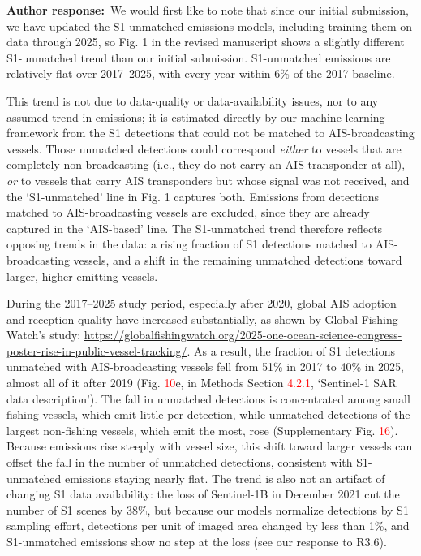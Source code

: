 \documentclass[11pt]{article}
\newcommand{\response}{\par\medskip\noindent%
  \textbf{\textcolor{respblue}{Author response:}}\ }
\begin{document}
\response We would first like to note that since our initial submission, we have updated the S1-unmatched emissions models, including training them on data through 2025, so Fig. 1 in the revised manuscript shows a slightly different S1-unmatched trend than our initial submission. S1-unmatched emissions are relatively flat over 2017--2025, with every year within 6\% of the 2017 baseline.

This trend is not due to data-quality or data-availability issues, nor to any assumed trend in emissions; it is estimated directly by our machine learning framework from the S1 detections that could not be matched to AIS-broadcasting vessels. Those unmatched detections could correspond \textit{either} to vessels that are completely non-broadcasting (i.e., they do not carry an AIS transponder at all), \textit{or} to vessels that carry AIS transponders but whose signal was not received, and the `S1-unmatched' line in Fig. 1 captures both. Emissions from detections matched to AIS-broadcasting vessels are excluded, since they are already captured in the `AIS-based' line. The S1-unmatched trend therefore reflects opposing trends in the data: a rising fraction of S1 detections matched to AIS-broadcasting vessels, and a shift in the remaining unmatched detections toward larger, higher-emitting vessels.

During the 2017--2025 study period, especially after 2020, global AIS adoption and reception quality have increased substantially, as shown by Global Fishing Watch's study: \url{https://globalfishingwatch.org/2025-one-ocean-science-congress-poster-rise-in-public-vessel-tracking/}. As a result, the fraction of S1 detections unmatched with AIS-broadcasting vessels fell from 51\% in 2017 to 40\% in 2025, almost all of it after 2019 (Fig. \textcolor{red}{10}e, in Methods Section \textcolor{red}{4.2.1}, `Sentinel-1 SAR data description'). The fall in unmatched detections is concentrated among small fishing vessels, which emit little per detection, while unmatched detections of the largest non-fishing vessels, which emit the most, rose (Supplementary Fig. \textcolor{red}{16}). Because emissions rise steeply with vessel size, this shift toward larger vessels can offset the fall in the number of unmatched detections, consistent with S1-unmatched emissions staying nearly flat. The trend is also not an artifact of changing S1 data availability: the loss of Sentinel-1B in December 2021 cut the number of S1 scenes by 38\%, but because our models normalize detections by S1 sampling effort, detections per unit of imaged area changed by less than 1\%, and S1-unmatched emissions show no step at the loss (see our response to R3.6).
\end{document}
